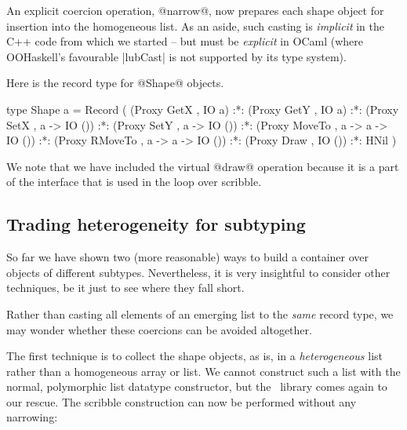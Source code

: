 An explicit coercion operation, @narrow@, now prepares each shape
object for insertion into the homogeneous list. As an aside, such
casting is \emph{implicit} in the C++ code from which we started --
but must be \emph{explicit} in OCaml (where OOHaskell's favourable
|lubCast| is not supported by its type system).

Here is the record type for @Shape@ objects.

\begin{code}
 type Shape a = Record (  (Proxy GetX    , IO a)
                      :*: (Proxy GetY    , IO a)
                      :*: (Proxy SetX    , a -> IO ())
                      :*: (Proxy SetY    , a -> IO ())
                      :*: (Proxy MoveTo  , a -> a -> IO ())
                      :*: (Proxy RMoveTo , a -> a -> IO ())
                      :*: (Proxy Draw    , IO ())
                      :*: HNil )
\end{code}

We note that we have included the virtual @draw@ operation because it
is a part of the interface that is used in the loop over scribble.






\medskip

\subsection{Trading heterogeneity for subtyping}

So far we have shown two (more reasonable) ways to build a container
over objects of different subtypes.  Nevertheless, it is very
insightful to consider other techniques, be it just to see where they
fall short.

Rather than casting all elements of an emerging list to the
\emph{same} record type, we may wonder whether these coercions can
be avoided altogether.

The first technique is to collect the shape objects, as is, in a
\emph{heterogeneous} list rather than a homogeneous array or list. We
cannot construct such a list with the normal, polymorphic list
datatype constructor, but the \HList\ library comes again to our
rescue. The scribble construction can now be performed without any
narrowing:

